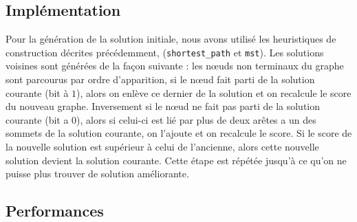 \documentclass[10pt]{article}
\begin{document}
\subsection{Implémentation}
Pour la génération de la solution initiale, nous avons utilisé les heuristiques de construction décrites précédemment, (\texttt{shortest\_path} et \texttt{mst}). Les solutions voisines sont générées de la façon suivante : les nœuds non terminaux du graphe sont parcourus par ordre d'apparition, si le nœud fait parti de la solution courante (bit à $1$), alors on enlève ce dernier de la solution et on recalcule le score du nouveau graphe. Inversement si le nœud ne fait pas parti de la solution courante (bit a $0$), alors si celui-ci est lié par plus de deux arêtes a un des sommets de la solution courante, on l'ajoute et on recalcule le score.
    Si le score de la nouvelle solution est supérieur à celui de l'ancienne, alors cette nouvelle solution devient la solution courante. Cette étape est répétée jusqu'à ce qu'on ne puisse plus trouver de solution améliorante.

    
\subsection{Performances}
\end{document}
